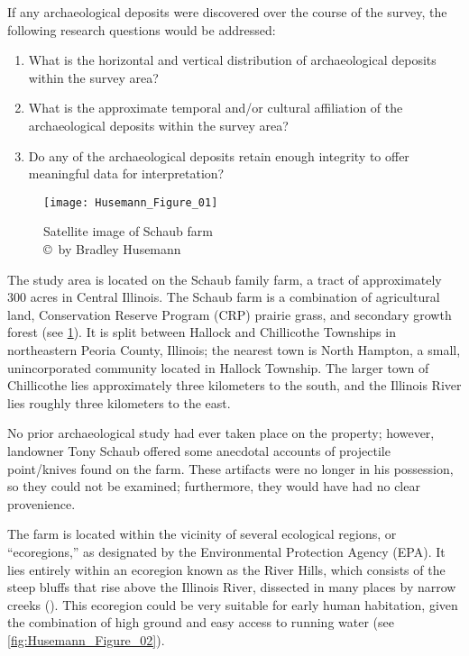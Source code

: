 If any archaeological deposits were discovered over the course of the survey, the following research questions would be addressed:

\begin{enumerate}
	\item What is the horizontal and vertical distribution of archaeological deposits within the survey area?
	\item What is the approximate temporal and/or cultural affiliation of the archaeological deposits within the survey area?
	\item Do any of the archaeological deposits retain enough integrity to offer meaningful data for interpretation?
\end{enumerate}


\begin{figure}[!htb]
	\texttt{[image: Husemann\_Figure\_01]}
	\caption{Satellite image of Schaub farm
		{\normalfont\scriptsize \\ \copyright\ by Bradley Husemann
	}}
	\label{fig:Husemann_Figure_01}
\end{figure}


The study area is located on the Schaub family farm, a tract of approximately 300 acres in Central Illinois. The Schaub farm is a combination of agricultural land, Conservation Reserve Program (CRP) prairie grass, and secondary growth forest (see \ref{fig:Husemann_Figure_01}). It is split between Hallock and Chillicothe Townships in northeastern Peoria County, Illinois; the nearest town is North Hampton, a small, unincorporated community located in Hallock Township. The larger town of Chillicothe lies approximately three kilometers to the south, and the Illinois River lies roughly three kilometers to the east.

No prior archaeological study had ever taken place on the property; however, landowner Tony Schaub offered some anecdotal accounts of projectile point/knives found on the farm. These artifacts were no longer in his possession, so they could not be examined; furthermore, they would have had no clear provenience.


The farm is located within the vicinity of several ecological regions, or “ecoregions,” as designated by the Environmental Protection Agency (EPA). It lies entirely within an ecoregion known as the River Hills, which consists of the steep bluffs that rise above the Illinois River, dissected in many places by narrow creeks (\cite{epa}). This ecoregion could be very suitable for early human habitation, given the combination of high ground and easy access to running water (see \cref{fig:Husemann_Figure_02}).

